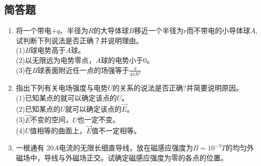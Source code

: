 \subsection{简答题}
\begin{enumerate}
\item 将一个带电$+q$、半径为$R$的大导体球$B$移近一个半径为$r$而不带电的小导体球$A$,试判断下列说法是否正确？并说明理由。\\
(1)$B$球电势高于$A$球。\\
(2)以无限远为电势零点，$A$球的电势小于0。\\
(3)在$B$球表面附近任一点的场强等于$\displaystyle \frac{q}{4\pi R^2}$
\item 指出下列有关电场强度与电势$U$的关系的说法是否正确?并简要说明原因。\\
(1)已知某点的就可以确定该点的$U$。\\
(2)已知某点的$U$就可以确定该点的$\vec E$。\\
(3)$\vec E$不变的空间，$U$也一定不变。\\
(4)$U$值相等的曲面上，$\vec E$值不一定相等。
\item 一根通有 $20A $电流的无限长细直导线，放在磁感应强度为$B=10^{-3}T$的均匀外磁场中，导线与外磁场正交。试确定磁感应强度为零的各点的位置。
\end{enumerate}
